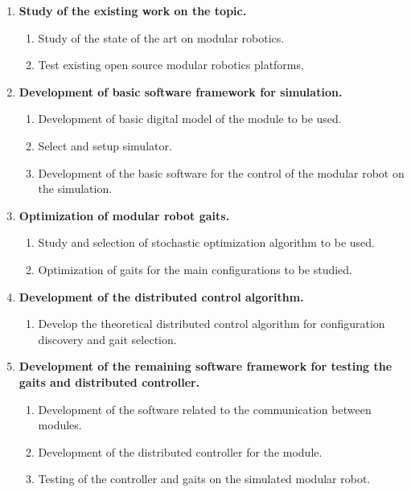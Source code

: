 \begin{enumerate}
	\item \textbf{Study of the existing work on the topic.}
		\begin{enumerate}
			\item Study of the state of the art on modular robotics.
			\item Test existing open source modular robotics platforms.
			~\\
		\end{enumerate}
		
	\item \textbf{Development of basic software framework for simulation.}
		\begin{enumerate}
			\item Development of basic digital model of the module to be used.
			\item Select and setup simulator.
			\item Development of the basic software for the control of the modular robot on the simulation.
			~\\
		\end{enumerate}				
		
	\item \textbf{Optimization of modular robot gaits.}
		\begin{enumerate}
			\item Study and selection of stochastic optimization algorithm to be used.
			\item Optimization of gaits for the main configurations to be studied.
			~\\
		\end{enumerate}
	
	\item \textbf{Development of the distributed control algorithm.}
		\begin{enumerate}
			\item Develop the theoretical distributed control algorithm for configuration discovery and gait selection.
			~\\
		\end{enumerate}
		
	\item \textbf{Development of the remaining software framework for testing the gaits and distributed controller.}
		\begin{enumerate}
			\item Development of the software related to the communication between modules.
			\item Development of the distributed controller for the module.
			\item Testing of the controller and gaits on the simulated modular robot.
			~\\
		\end{enumerate}


\end{enumerate}
